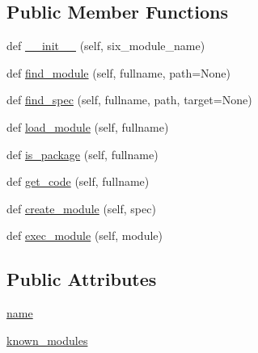 \subsection*{Public Member Functions}
\begin{DoxyCompactItemize}
\item 
def \hyperlink{classpip_1_1__vendor_1_1urllib3_1_1packages_1_1six_1_1__SixMetaPathImporter_a41f3d827c419d084b13ab6c0c857f394}{\+\_\+\+\_\+init\+\_\+\+\_\+} (self, six\+\_\+module\+\_\+name)
\item 
def \hyperlink{classpip_1_1__vendor_1_1urllib3_1_1packages_1_1six_1_1__SixMetaPathImporter_aad9af1e8c00c80f0f0a3c2032040cb7e}{find\+\_\+module} (self, fullname, path=None)
\item 
def \hyperlink{classpip_1_1__vendor_1_1urllib3_1_1packages_1_1six_1_1__SixMetaPathImporter_a4630f2d8f3329c844a42a61f4ef09af8}{find\+\_\+spec} (self, fullname, path, target=None)
\item 
def \hyperlink{classpip_1_1__vendor_1_1urllib3_1_1packages_1_1six_1_1__SixMetaPathImporter_a6f2e362c0b00dbfc6d5d4b476f69a876}{load\+\_\+module} (self, fullname)
\item 
def \hyperlink{classpip_1_1__vendor_1_1urllib3_1_1packages_1_1six_1_1__SixMetaPathImporter_a357496d27a5adfb15063c72c69745c35}{is\+\_\+package} (self, fullname)
\item 
def \hyperlink{classpip_1_1__vendor_1_1urllib3_1_1packages_1_1six_1_1__SixMetaPathImporter_a11b5cf92304c07efaffd7bb5fe2a7dc8}{get\+\_\+code} (self, fullname)
\item 
def \hyperlink{classpip_1_1__vendor_1_1urllib3_1_1packages_1_1six_1_1__SixMetaPathImporter_a7860b9b2e4709940f663c41422638a12}{create\+\_\+module} (self, spec)
\item 
def \hyperlink{classpip_1_1__vendor_1_1urllib3_1_1packages_1_1six_1_1__SixMetaPathImporter_a52ce1befa1cc853c15d0d24b70909241}{exec\+\_\+module} (self, module)
\end{DoxyCompactItemize}
\subsection*{Public Attributes}
\begin{DoxyCompactItemize}
\item 
\hyperlink{classpip_1_1__vendor_1_1urllib3_1_1packages_1_1six_1_1__SixMetaPathImporter_afea8fef00c67c4291ea453032a5be815}{name}
\item 
\hyperlink{classpip_1_1__vendor_1_1urllib3_1_1packages_1_1six_1_1__SixMetaPathImporter_a1876098514f8e7790f94c77d8cede650}{known\+\_\+modules}
\end{DoxyCompactItemize}
